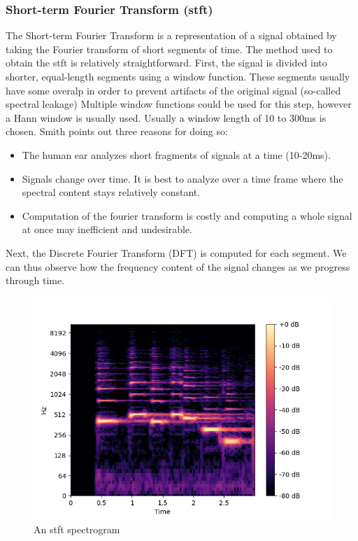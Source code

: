 \documentclass[11pt]{article}
\begin{document}
\subsubsection{Short-term Fourier Transform (stft)}
\label{sec:org5ad94c1}
The Short-term Fourier Transform is a representation of a signal obtained by taking the Fourier transform of short segments of time. The method used to obtain the stft is relatively straightforward. First, the signal is divided into shorter, equal-length segments using a window function. These segments usually have some overalp in order to prevent artifacts of the original signal (so-called spectral leakage) Multiple window functions could be used for this step, however a Hann window is usually used. Usually a window length of 10 to 300ms is chosen. Smith \cite{book} points out three reasons for doing so:

\begin{itemize}
\item The human ear analyzes short fragments of signals at a time (10-20ms).
\item Signals change over time. It is best to analyze over a time frame where the spectral content stays relatively constant.
\item Computation of the fourier transform is costly and computing a whole signal at once may inefficient and undesirable.
\end{itemize}

Next, the Discrete Fourier Transform (DFT) is computed for each segment. We can thus observe how the frequency content of the signal changes as we progress through time.

\begin{figure}[h!]
\centering
\includegraphics[width=\textwidth]{./Figures/orig_stft.png}
\caption{An stft spectrogram}
\end{figure}
\end{document}
